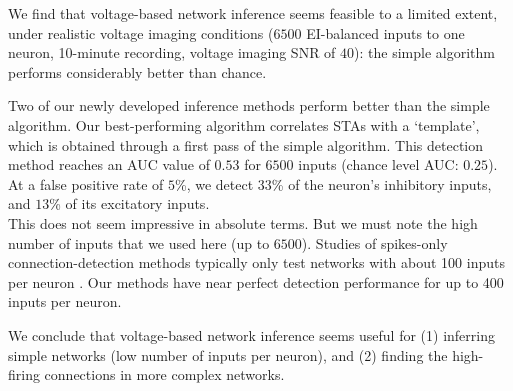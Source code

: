 We find that voltage-based network inference seems feasible to a limited extent, under realistic voltage imaging conditions ($6500$ EI-balanced inputs to one neuron, 10-minute
recording, voltage imaging SNR of $40$): the simple algorithm performs considerably better than chance.

Two of our newly developed inference methods perform better than the simple algorithm. Our best-performing algorithm correlates STAs with a `template', which is obtained through a first pass of the simple algorithm. This detection method reaches an AUC value of $0.53$ for $6500$ inputs (chance level AUC: $0.25$). At a false positive rate of $5$\%, we detect $33$\% of the neuron's inhibitory inputs, and $13$\% of its excitatory inputs.\\
This does not seem impressive in absolute terms. But we must note the high number of inputs that we used here (up to $6500$). Studies of spikes-only connection-detection methods typically only test networks with about 100 inputs per neuron \cite{Ito2011ExtendingTransferEntropy,Guyon2014DesignFirstNeuronal}.
Our methods have near perfect detection performance for up to 400 inputs per neuron.

We conclude that voltage-based network inference seems useful for (1) inferring simple networks (low number of inputs per neuron), and (2) finding the high-firing connections in more complex networks.
